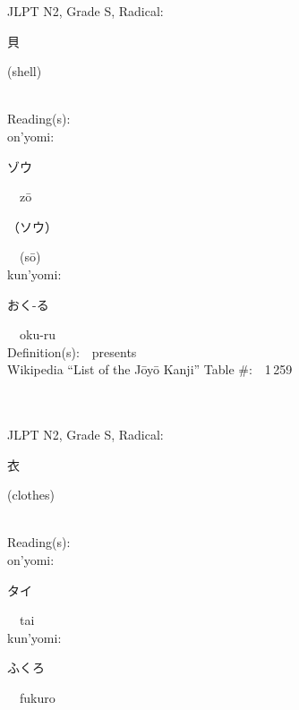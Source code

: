 \begin{multicols}{2}
{JLPT N2, Grade S, Radical:\ \ {\begin{CJK}{UTF8}{min} 貝 \end{CJK}} (shell) } \\
Reading(s):\ \ \\
{\hspace*{1em}}on'yomi:\ \ \\
{\hspace*{2em}}{\begin{CJK}{UTF8}{min} ゾウ \end{CJK}}\ \ z\=o\ \ \\
{\hspace*{2em}}{\begin{CJK}{UTF8}{min} （ソウ） \end{CJK}}\ \ (s\=o)\ \ \\
{\hspace*{1em}}kun'yomi:\ \ \\
{\hspace*{2em}}{\begin{CJK}{UTF8}{min} おく-る \end{CJK}}\ \ oku-ru\ \ \\
Definition(s):\ \ presents \\
Wikipedia ``List of the J\=oy\=o Kanji'' Table \#:\ \ 1\,259 \\
\ \ \\
{\fontsize{34pt}{40pt}  }\ \ \\  %
{JLPT N2, Grade S, Radical:\ \ {\begin{CJK}{UTF8}{min} 衣 \end{CJK}} (clothes) } \\
Reading(s):\ \ \\
{\hspace*{1em}}on'yomi:\ \ \\
{\hspace*{2em}}{\begin{CJK}{UTF8}{min} タイ \end{CJK}}\ \ tai\ \ \\
{\hspace*{1em}}kun'yomi:\ \ \\
{\hspace*{2em}}{\begin{CJK}{UTF8}{min} ふくろ \end{CJK}}\ \ fukuro\ \ \\

\end{multicols}
